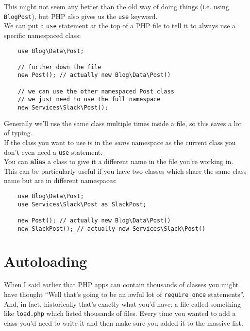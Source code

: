 This might not seem any better than the old way of doing things (i.e. using \texttt{BlogPost}), but PHP also gives us the \texttt{use} keyword.
\\

We can put a \texttt{use} statement at the top of a PHP file to tell it to always use a specific namespaced class:

\begin{verbatim}
    use Blog\Data\Post;

    // further down the file
    new Post(); // actually new Blog\Data\Post()

    // we can use the other namespaced Post class
    // we just need to use the full namespace
    new Services\Slack\Post();
\end{verbatim}

Generally we'll use the same class multiple times inside a file, so this saves a lot of typing.
\\

If the class you want to use is in the \textit{same} namespace as the current class you don't even need a \texttt{use} statement.
\\

You can \textbf{alias} a class to give it a different name in the file you're working in. This can be particularly useful if you have two classes which share the same class name but are in different namespaces:

\begin{verbatim}
    use Blog\Data\Post;
    use Services\Slack\Post as SlackPost;

    new Post(); // actually new Blog\Data\Post()
    new SlackPost(); // actually new Services\Slack\Post()
\end{verbatim}



\section{Autoloading}

When I said earlier that PHP apps can contain thousands of classes you might have thought ``Well that's going to be an awful lot of \texttt{require\_once} statements''. And, in fact, historically that's exactly what you'd have: a file called something like \texttt{load.php} which listed thousands of files. Every time you wanted to add a class you'd need to write it and then make sure you added it to the massive list.
\\

